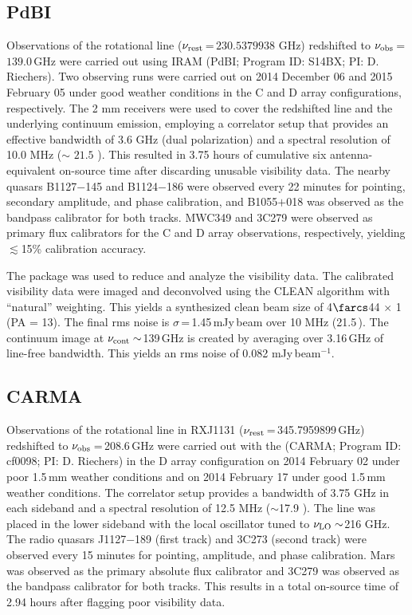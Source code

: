 \documentclass[]{emulateapj}
\begin{document}
\subsection{PdBI \bco}
Observations of the \bco rotational line
($\nu_{\rm rest}$\,=\,$230.5379938$ GHz) redshifted to $\nu_{\rm obs}$\,=\,$139.0$\,GHz
were carried out using IRAM \pdbi (PdBI; Program ID: S14BX; PI: D.
Riechers). Two observing runs were carried out on 2014 December 06 and 2015
February 05 under good weather conditions in the C and D array configurations,
respectively. The 2 mm receivers were used to cover the redshifted \bco line
and the underlying continuum emission, employing a correlator setup that provides
an effective bandwidth of 3.6 GHz (dual polarization) and a spectral resolution of 10.0 MHz ($\sim$
$21.5$ \kms). This resulted in 3.75 hours of cumulative six antenna-equivalent on-source
 time after discarding unusable visibility data.
The nearby quasars B1127$-$145 and B1124$-$186 were observed every 22 minutes
for pointing, secondary amplitude, and phase calibration, and B1055$+$018 was
observed as the bandpass calibrator for both tracks.
MWC349 and 3C279 were observed as primary flux calibrators for the C and D
array observations, respectively, yielding $\lesssim$15\% calibration accuracy.

The  package was used to reduce and analyze the visibility data.
The calibrated visibility data were imaged and deconvolved using the CLEAN algorithm with ``natural''
weighting. This yields a synthesized clean beam size of 4$\farcs$44 $\times$ 1 (PA = 13\degr).
The final rms noise is $\sigma$\,=\,1.45\,mJy\,beam\pmOne
over 10 MHz (21.5\,\kms). The continuum image at $\nu_{\rm cont}\sim$139\,GHz
is created by averaging over 3.16\,GHz of line-free bandwidth. This
yields an rms noise of 0.082 mJy\,beam$^{-1}$. %

\subsection{CARMA \cco}
Observations of the \cco rotational line in RXJ1131
($\nu_{\rm rest}$\,=\,345.7959899\,GHz) redshifted to $\nu_{\rm obs}$\,=\,208.6\,GHz
were carried out with the \carma (CARMA;
Program ID: cf0098; PI: D. Riechers)
in the D array configuration on 2014 February 02 under poor 1.5\,mm
weather conditions and on 2014 February 17 under good 1.5\,mm
weather conditions. The correlator setup provides a bandwidth of 3.75 GHz in
each sideband and a spectral resolution of 12.5 MHz ($\sim$17.9 \kms). The
line was placed in the lower sideband with the local oscillator tuned to $\nu_{\rm LO}\sim$216 GHz. The radio quasars J1127$-$189 (first track) and 3C273
(second track) were observed
every 15 minutes for pointing, amplitude, and phase calibration. Mars was
observed as the primary absolute flux calibrator and 3C279 was observed as
the bandpass calibrator for both tracks. This results in a total on-source time of 2.94 hours after flagging poor
visibility data.
\end{document}
